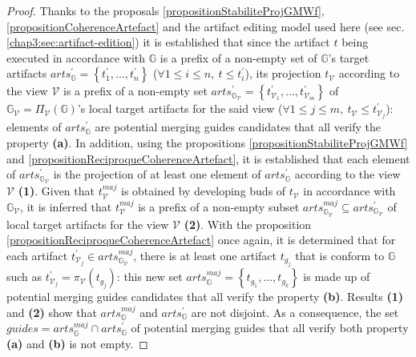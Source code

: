 {\begin{proof}
	Thanks to the proposals \ref{propositionStabiliteProjGMWf}, \ref{propositionCoherenceArtefact} and the artifact editing model used here (see sec. \ref{chap3:sec:artifact-edition}) it is established that since the artifact $t$ being executed in accordance with $\mathbb{G}$ is a prefix of a non-empty set of $\mathbb{G}$'s target artifacts $arts_{\mathbb{G}}^{'} = \left\{t_{1}^{'},\ldots, t_{n}^{'}\right\}$ ($\forall 1 \leq i \leq n, ~t \leq t_{i}^{'}$), its projection $t_{\mathcal{V}}$ according to the view $\mathcal{V}$ is a prefix of a non-empty set $arts_{\mathbb{G}_{\mathcal{V}}}^{'} = \left\{t_{{\mathcal{V}}_{1}}^{'},\ldots, t_{{\mathcal{V}}_{m}}^{'}\right\}$ of $\mathbb{G}_{\mathcal{V}} = \Pi_{\mathcal{V}}\left(\mathbb{G} \right)$'s local target artifacts for the said view ($\forall 1 \leq j \leq m, ~t_{\mathcal{V}} \leq t_{{\mathcal{V}}_{j}}^{'}$): elements of $arts_{\mathbb{G}}^{'}$ are potential merging guides candidates that all verify the property \textbf{(a)}. In addition, using the propositions \ref{propositionStabiliteProjGMWf} and \ref{propositionReciproqueCoherenceArtefact}, it is established that each element of $arts_{\mathbb{G}_{\mathcal{V}}}^{'}$ is the projection of at least one element of $arts_{\mathbb{G}}^{'}$ according to the view $\mathcal{V}$ \textbf{(1)}. Given that $t_{\mathcal{V}}^{maj}$ is obtained by developing buds of $t_{\mathcal{V}}$ in accordance with $\mathbb{G}_{\mathcal{V}}$, it is inferred that $t_{\mathcal{V}}^{maj}$ is a prefix of a non-empty subset $arts_{\mathbb{G}_{\mathcal{V}}}^{maj} \subseteq arts_{\mathbb{G}_{\mathcal{V}}}^{'}$ of local target artifacts for the view $\mathcal{V}$ \textbf{(2)}. With the proposition \ref{propositionReciproqueCoherenceArtefact} once again, it is determined that for each artifact $t_{{\mathcal{V}}_{j}}^{'} \in arts_{\mathbb{G}_{\mathcal{V}}}^{maj}$, there is at least one artifact $t_{g_j}$ that is conform to $\mathbb{G}$ such as $t_{{\mathcal{V}}_{j}}^{'} = \pi_{\mathcal{V}}\left(t_{g_j} \right)$: this new set $arts_{\mathbb{G}}^{maj} = \left\{t_{g_1},\ldots, t_{g_k}\right\}$ is made up of potential merging guides candidates that all verify the property \textbf{(b)}. Results \textbf{(1)} and \textbf{(2)} show that $arts_{\mathbb{G}}^{maj}$ and $arts_{\mathbb{G}}^{'}$ are not disjoint. As a consequence, the set $guides= arts_{\mathbb{G}}^{maj} \cap arts_{\mathbb{G}}^{'}$ of potential merging guides that all verify both property \textbf{(a)} and \textbf{(b)} is not empty.
\end{proof}

}
